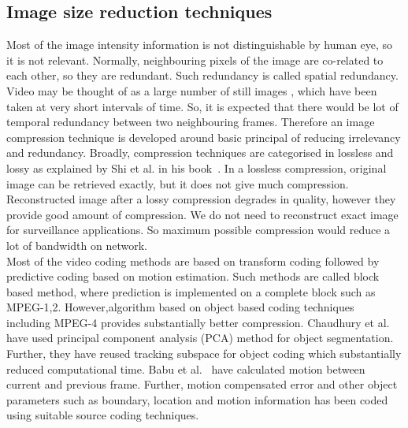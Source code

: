\subsection{Image size reduction techniques}
\indent Most of the image intensity information is not distinguishable
by human eye, so it is not relevant. Normally, neighbouring pixels of
the image are co-related to each other, so they are redundant. Such
redundancy is called spatial redundancy. Video may be thought of as a
large number of still images , which have been taken at very short
intervals of time. So, it is expected that there would be lot of
temporal redundancy between two neighbouring frames.  Therefore an image
compression technique is developed around basic principal of reducing
irrelevancy and redundancy. Broadly, compression techniques are
categorised in lossless and lossy as explained by Shi et al. in his
book~\cite{6}. In a lossless compression, original image can be
retrieved exactly, but it does not give much compression.  Reconstructed
image after a lossy compression degrades in quality, however they
provide good amount of compression. We do not need to reconstruct exact
image for surveillance applications. So maximum possible compression
would reduce a lot of bandwidth on network.\\
\indent Most of the video coding methods are based on transform coding
followed by predictive coding based on motion estimation. Such methods
are called block based method, where prediction is implemented on a
complete block such as  MPEG-1,2. However,algorithm based
on object based coding techniques~\cite{7, 8} including MPEG-4 provides
substantially better compression. Chaudhury et al.~\cite{7} have used
principal component analysis (PCA) method for object
segmentation. Further, they have reused tracking subspace for object
coding which substantially reduced computational time. Babu et al.~\cite{8}
have calculated motion between current and previous frame.
Further, motion compensated error and other object parameters such as
boundary, location and motion information has been coded using suitable
source coding techniques.
